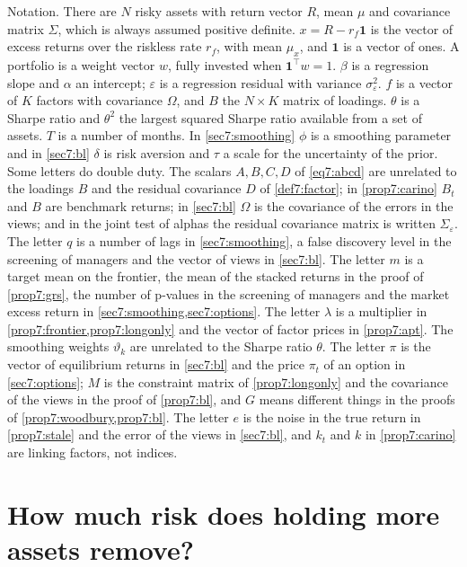 \begin{chapterrefs}
\begin{keybox}
Notation. There are $N$ risky assets with return vector $R$, mean $\mu$ and covariance matrix
$\Sigma$, which is always assumed positive definite. $x=R-r_f\mathbf 1$ is the vector of excess
returns over the riskless rate $r_f$, with mean $\mu_x$, and $\mathbf 1$ is a vector of ones. A
portfolio is a weight vector $w$, fully invested when $\mathbf 1^\top w=1$. $\beta$ is a regression
slope and $\alpha$ an intercept; $\varepsilon$ is a regression residual with variance $\sigma_\varepsilon^2$.
$f$ is a vector of $K$ factors with covariance $\Omega$, and $B$ the $N\times K$ matrix of loadings.
$\theta$ is a Sharpe ratio and $\theta^2$ the largest squared Sharpe ratio available from a set of
assets. $T$ is a number of months. In \cref{sec7:smoothing} $\phi$ is a smoothing parameter and in
\cref{sec7:bl} $\delta$ is risk aversion and $\tau$ a scale for the uncertainty of the prior.
Some letters do double duty. The scalars $A,B,C,D$ of \cref{eq7:abcd} are unrelated to the loadings
$B$ and the residual covariance $D$ of \cref{def7:factor}; in \cref{prop7:carino} $B_t$ and $B$ are
benchmark returns; in \cref{sec7:bl} $\Omega$ is the covariance of the errors in the views; and in the
joint test of alphas the residual covariance matrix is written $\Sigma_\varepsilon$.
The letter $q$ is a number of lags in \cref{sec7:smoothing}, a false discovery level in the screening
of managers and the vector of views in \cref{sec7:bl}. The letter $m$ is a target mean on the frontier,
the mean of the stacked returns in the proof of \cref{prop7:grs}, the number of p-values in the
screening of managers and the market excess return in \cref{sec7:smoothing,sec7:options}. The letter
$\lambda$ is a multiplier in \cref{prop7:frontier,prop7:longonly} and the vector of factor prices in
\cref{prop7:apt}. The smoothing weights $\vartheta_k$ are unrelated to the Sharpe ratio $\theta$.
The letter $\pi$ is the vector of equilibrium returns in \cref{sec7:bl} and the price $\pi_t$ of an
option in \cref{sec7:options}; $M$ is the constraint matrix of \cref{prop7:longonly} and the covariance
of the views in the proof of \cref{prop7:bl}, and $G$ means different things in the proofs of
\cref{prop7:woodbury,prop7:bl}. The letter $e$ is the noise in the true return in \cref{prop7:stale}
and the error of the views in \cref{sec7:bl}, and $k_t$ and $k$ in \cref{prop7:carino} are linking
factors, not indices.
\end{keybox}

\FloatBarrier
\section{How much risk does holding more assets remove?}
\label{sec7:diversify}


\end{chapterrefs}
